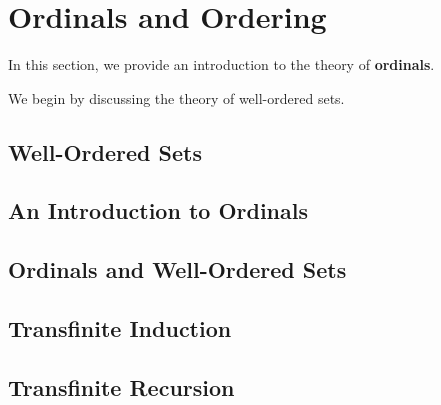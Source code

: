 \section{Ordinals and Ordering}

In this section, we provide an introduction to the theory of \textbf{ordinals}.

\sorry

We begin by discussing the theory of well-ordered sets.

\subsection{Well-Ordered Sets}

\begin{boxdefinition}
    \sorry
\end{boxdefinition}

\begin{boxdefinition}
    \sorry
\end{boxdefinition}



\subsection{An Introduction to Ordinals}


\subsection{Ordinals and Well-Ordered Sets}


\subsection{Transfinite Induction}

\subsection{Transfinite Recursion}